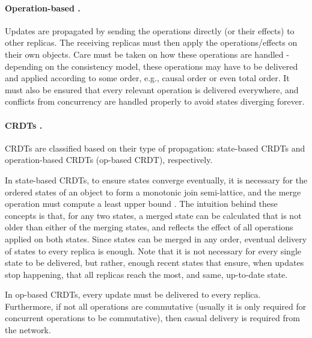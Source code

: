 \paragraph{Operation-based \cite{crdt}.}
Updates are propagated by sending the operations directly (or their effects) to other replicas.
The receiving replicas must then apply the operations/effects on their own objects.
Care must be taken on how these operations are handled - depending on the consistency model, these operations may have to be delivered and applied according to some order, e.g., causal order or even total order.
It must also be ensured that every relevant operation is delivered everywhere, and conflicts from concurrency are handled properly to avoid states diverging forever.

\paragraph{CRDTs \cite{crdt}.}
CRDTs are classified based on their type of propagation: state-based CRDTs and operation-based CRDTs (op-based CRDT), respectively.

In state-based CRDTs, to ensure states converge eventually, it is necessary for the ordered states of an object to form a monotonic join semi-lattice, and the merge operation must compute a least upper bound \cite{crdt, stateCRDT}. The intuition behind these concepts is that, for any two states, a merged state can be calculated that is not older than either of the merging states, and reflects the effect of all operations applied on both states.
Since states can be merged in any order, eventual delivery of states to every replica is enough.
Note that it is not necessary for every single state to be delivered, but rather, enough recent states that ensure, when updates stop happening, that all replicas reach the most, and same, up-to-date state.

In op-based CRDTs, every update must be delivered to every replica.
Furthermore, if not all operations are commutative (usually it is only required for concurrent operations to be commutative), then casual delivery is required from the network.


